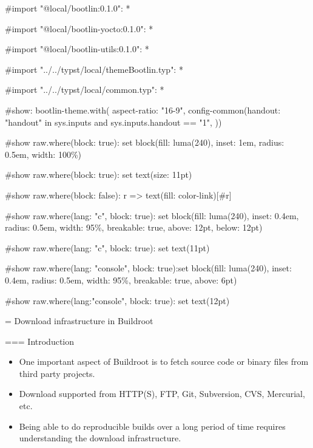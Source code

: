 
#import "@local/bootlin:0.1.0": *

#import "@local/bootlin-yocto:0.1.0": *

#import "@local/bootlin-utils:0.1.0": *

#import "../../typst/local/themeBootlin.typ": *

#import "../../typst/local/common.typ": *

#show: bootlin-theme.with( aspect-ratio: "16-9", config-common(handout: "handout" in sys.inputs and sys.inputs.handout == "1", ))

#show raw.where(block: true): set block(fill: luma(240), inset: 1em, radius: 0.5em, width: 100\%)

#show raw.where(block: true): set text(size: 11pt)

#show raw.where(block: false): r => text(fill: color-link)[#r]

#show raw.where(lang: "c", block: true): set block(fill: luma(240), inset: 0.4em, radius: 0.5em, width: 95\%, breakable: true, above: 12pt, below: 12pt)

#show raw.where(lang: "c", block: true): set text(11pt)

#show raw.where(lang: "console", block: true):set block(fill: luma(240), inset: 0.4em, radius: 0.5em, width: 95\%, breakable: true, above: 6pt)

#show raw.where(lang:"console", block: true): set text(12pt)

 = Download infrastructure in Buildroot

=== {Introduction}
  \begin{itemize}
  \item One important aspect of Buildroot is to fetch source code or
    binary files from third party projects.
  \item Download supported from HTTP(S), FTP, Git, Subversion, CVS,
    Mercurial, etc.
  \item Being able to do reproducible builds over a long period of
    time requires understanding the download infrastructure.
  \end{itemize}


